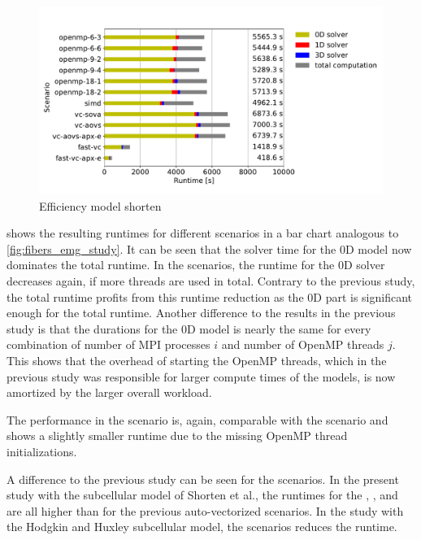 \begin{figure}
  \centering%
  \includegraphics[width=\textwidth]{images/results/studies/fibers_emg_study_shorten.pdf}%
  \caption{Efficiency model shorten}%
  \label{fig:fibers_emg_study_shorten}%
\end{figure}%

 shows the resulting runtimes for different scenarios in a bar chart analogous to \cref{fig:fibers_emg_study}. It can be seen that the solver time for the 0D model now dominates the total runtime. In the  scenarios, the runtime for the 0D solver decreases again, if more threads are used in total. Contrary to the previous study, the total runtime profits from this runtime reduction as the 0D part is significant enough for the total runtime. Another difference to the results in the previous study is that the durations for the 0D model is nearly the same for every combination of number of MPI processes $i$ and number of OpenMP threads $j$. This shows that the overhead of starting the OpenMP threads, which in the previous study was responsible for larger compute times of the models, is now amortized by the larger overall workload.

The performance in the  scenario is, again, comparable with the  scenario and shows a slightly smaller runtime due to the missing OpenMP thread initializations.

A difference to the previous study can be seen for the  scenarios. In the present study with the subcellular model of Shorten et al., the runtimes for the , , and  are all higher than for the previous auto-vectorized scenarios. In the study with the Hodgkin and Huxley subcellular model, the  scenarios reduces the runtime. 

